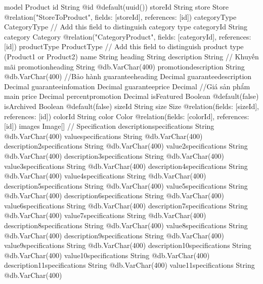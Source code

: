 model Product {
  id               String                 @id @default(uuid())
  storeId          String
  store            Store                  @relation("StoreToProduct", fields: [storeId], references: [id])
  categoryType     CategoryType           // Add this field to distinguish category type
  categoryId       String
  category         Category               @relation("CategoryProduct", fields: [categoryId], references: [id])
  productType      ProductType            // Add this field to distinguish product type (Product1 or Product2)
  name             String
  heading          String
  description      String
  // Khuyến mãi
  promotionheading String                 @db.VarChar(400)
  promotiondescription String              @db.VarChar(400)
  //Bảo hành
  guaranteeheading Decimal
  guaranteedescription Decimal
  guaranteeinfomation Decimal
  guaranteeprice   Decimal
  //Giá sản phẩm main
  price            Decimal
  percentpromotion Decimal
  isFeatured       Boolean                @default(false)
  isArchived       Boolean                @default(false)
  sizeId           String
  size             Size                   @relation(fields: [sizeId], references: [id])
  colorId          String
  color            Color                  @relation(fields: [colorId], references: [id])
  images           Image[]
  // Specification
  descriptionspecifications String       @db.VarChar(400)
  valuespecifications       String       @db.VarChar(400)
  description2specifications String       @db.VarChar(400)
  value2specifications      String       @db.VarChar(400)
  description3specifications String       @db.VarChar(400)
  value3specifications      String       @db.VarChar(400)
  description4specifications String       @db.VarChar(400)
  value4specifications      String       @db.VarChar(400)
  description5specifications String       @db.VarChar(400)
  value5specifications      String       @db.VarChar(400)
  description6specifications String       @db.VarChar(400)
  value6specifications      String       @db.VarChar(400)
  description7specifications String       @db.VarChar(400)
  value7specifications      String       @db.VarChar(400)
  description8specifications String       @db.VarChar(400)
  value8specifications      String       @db.VarChar(400)
  description9specifications String       @db.VarChar(400)
  value9specifications      String       @db.VarChar(400)
  description10specifications String     @db.VarChar(400)
  value10specifications       String     @db.VarChar(400)
  description11specifications String     @db.VarChar(400)
  value11specifications       String     @db.VarChar(400)
}

